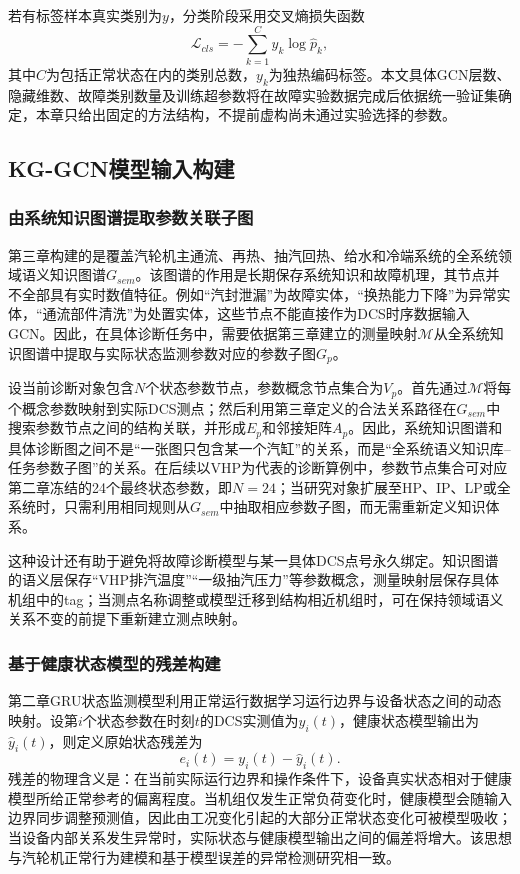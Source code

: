 若有标签样本真实类别为$y$，分类阶段采用交叉熵损失函数
\begin{equation}
    \mathcal L_{cls}=-\sum_{k=1}^{C}y_k\log\hat p_k,
\end{equation}
其中$C$为包括正常状态在内的类别总数，$y_k$为独热编码标签。本文具体GCN层数、隐藏维数、故障类别数量及训练超参数将在故障实验数据完成后依据统一验证集确定，本章只给出固定的方法结构，不提前虚构尚未通过实验选择的参数。

\subsection{KG-GCN模型输入构建}
\label{subsec:kg_gcn_input}

\subsubsection{由系统知识图谱提取参数关联子图}

第三章构建的是覆盖汽轮机主通流、再热、抽汽回热、给水和冷端系统的全系统领域语义知识图谱$G_{sem}$。该图谱的作用是长期保存系统知识和故障机理，其节点并不全部具有实时数值特征。例如“汽封泄漏”为故障实体，“换热能力下降”为异常实体，“通流部件清洗”为处置实体，这些节点不能直接作为DCS时序数据输入GCN。因此，在具体诊断任务中，需要依据第三章建立的测量映射$\mathcal M$从全系统知识图谱中提取与实际状态监测参数对应的参数子图$G_p$。

设当前诊断对象包含$N$个状态参数节点，参数概念节点集合为$V_p$。首先通过$\mathcal M$将每个概念参数映射到实际DCS测点；然后利用第三章定义的合法关系路径在$G_{sem}$中搜索参数节点之间的结构关联，并形成$E_p$和邻接矩阵$A_p$。因此，系统知识图谱和具体诊断图之间不是“一张图只包含某一个汽缸”的关系，而是“全系统语义知识库--任务参数子图”的关系。在后续以VHP为代表的诊断算例中，参数节点集合可对应第二章冻结的24个最终状态参数，即$N=24$；当研究对象扩展至HP、IP、LP或全系统时，只需利用相同规则从$G_{sem}$中抽取相应参数子图，而无需重新定义知识体系。

这种设计还有助于避免将故障诊断模型与某一具体DCS点号永久绑定。知识图谱的语义层保存“VHP排汽温度”“一级抽汽压力”等参数概念，测量映射层保存具体机组中的tag；当测点名称调整或模型迁移到结构相近机组时，可在保持领域语义关系不变的前提下重新建立测点映射。

\subsubsection{基于健康状态模型的残差构建}

第二章GRU状态监测模型利用正常运行数据学习运行边界与设备状态之间的动态映射。设第$i$个状态参数在时刻$t$的DCS实测值为$y_i(t)$，健康状态模型输出为$\hat y_i(t)$，则定义原始状态残差为
\begin{equation}
    e_i(t)=y_i(t)-\hat y_i(t).
\end{equation}
残差的物理含义是：在当前实际运行边界和操作条件下，设备真实状态相对于健康模型所给正常参考的偏离程度。当机组仅发生正常负荷变化时，健康模型会随输入边界同步调整预测值，因此由工况变化引起的大部分正常状态变化可被模型吸收；当设备内部关系发生异常时，实际状态与健康模型输出之间的偏差将增大。该思想与汽轮机正常行为建模和基于模型误差的异常检测研究相一致\cite{Ko2022DynamicThresholdAE,Chen2023AdaptiveTransfer}。

